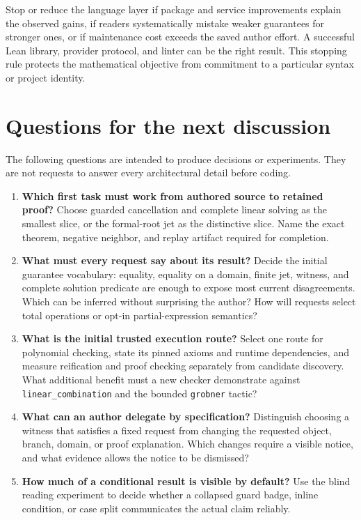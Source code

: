 \documentclass[11pt,letterpaper]{article}
\begin{document}
Stop or reduce the language layer if package and service improvements explain
the observed gains, if readers systematically mistake weaker guarantees for
stronger ones, or if maintenance cost exceeds the saved author effort. A
successful Lean library, provider protocol, and linter can be the right result.
This stopping rule protects the mathematical objective from commitment to a
particular syntax or project identity.

\clearpage
\section{Questions for the next discussion}\label{sec:questions}
The following questions are intended to produce decisions or experiments. They
are not requests to answer every architectural detail before coding.
\begin{enumerate}[label=\textbf{Q\arabic*.},itemsep=.7em]
\item \textbf{Which first task must work from authored source to retained proof?}
Choose guarded cancellation and complete linear solving as the smallest slice,
or the formal-root jet as the distinctive slice. Name the exact theorem,
negative neighbor, and replay artifact required for completion.

\item \textbf{What must every request say about its result?} Decide the initial
guarantee vocabulary: equality, equality on a domain, finite jet, witness, and
complete solution predicate are enough to expose most current disagreements.
Which can be inferred without surprising the author? How will requests select
total operations or opt-in partial-expression semantics?

\item \textbf{What is the initial trusted execution route?} Select one route
for polynomial checking, state its pinned axioms and runtime dependencies, and
measure reification and proof checking separately from candidate discovery.
What additional benefit must a new checker demonstrate against
\texttt{linear\_combination} and the bounded \texttt{grobner} tactic?

\item \textbf{What can an author delegate by specification?} Distinguish choosing
a witness that satisfies a fixed request from changing the requested object,
branch, domain, or proof explanation. Which changes require a visible notice,
and what evidence allows the notice to be dismissed?

\item \textbf{How much of a conditional result is visible by default?} Use the
blind reading experiment to decide whether a collapsed guard badge, inline
condition, or case split communicates the actual claim reliably.


\end{enumerate}
\end{document}
